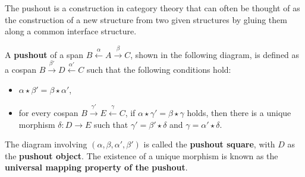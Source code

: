 The pushout is a construction in category theory that can often be thought of as the construction of a new structure from two given structures by gluing them along a common interface structure.
\begin{definition}
    \label{def:cat:po} 
    A \textbf{pushout} of a span \( B \overset{\alpha}{\leftarrow} A \overset{\beta}{\rightarrow} C \), shown in the following diagram,
    is defined as a cospan \( B \overset{\beta'}{\rightarrow} D \overset{\alpha'}{\leftarrow} C \) such that the following conditions hold:
    \begin{itemize}
        \item \( \alpha \mathop{\star} \beta' \mathop{=} \beta \mathop{\star} \alpha' \),
        \item for every cospan \( B \overset{\gamma'}{\rightarrow} E \overset{\gamma}{\leftarrow} C \), if \( \alpha \mathop{\star} \gamma' \mathop{=} \beta \mathop{\star} \gamma \) holds, then there is a unique morphism \(\delta : D  \mathop{\to} E\) such that \( \gamma' \mathop{=} \beta' \mathop{\star} \delta \) and \( \gamma \mathop{=} \alpha' \mathop{\star} \delta \).
    \end{itemize} 
    \begin{center}
            \end{center}
The diagram involving \( (\alpha, \beta, \alpha', \beta') \) is called the \textbf{pushout square}, with \(D\) as the \textbf{pushout object}. The existence of a unique morphism is known as the \textbf{universal mapping property of the pushout}.
\end{definition} 

